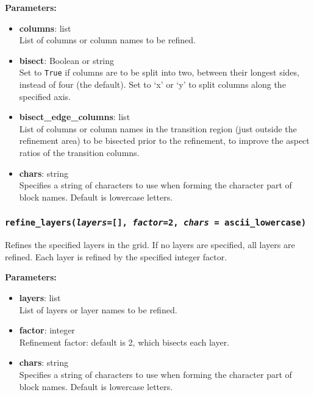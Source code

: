 \textbf{Parameters:}
\begin{itemize}
  \item \textbf{columns}: list\\
    List of columns or column names to be refined.
  \item \textbf{bisect}: Boolean or string\\
    Set to \texttt{True} if columns are to be split into two, between their longest sides, instead of four (the default).  Set to `x' or `y' to split columns along the specified axis.
  \item \textbf{bisect\_edge\_columns}: list\\
    List of columns or column names in the transition region (just outside the refinement area) to be bisected prior to the refinement, to improve the aspect ratios of the transition columns.
  \item \textbf{chars}: string\\
    Specifies a string of characters to use when forming the character part of block names.  Default is lowercase letters.
\end{itemize}

\begin{snugshade}
\subsubsection{\texttt{refine\_layers(\emph{layers}=[], \emph{factor}=2, \emph{chars} = ascii\_lowercase)}}\end{snugshade}
\label{sec:mulgrid:refine_layers}

Refines the specified layers in the grid.  If no layers are specified, all layers are refined.  Each layer is refined by the specified integer factor.

\textbf{Parameters:}
\begin{itemize}
  \item \textbf{layers}: list\\
    List of layers or layer names to be refined.
  \item \textbf{factor}: integer\\
    Refinement factor: default is 2, which bisects each layer.
  \item \textbf{chars}: string\\
    Specifies a string of characters to use when forming the character part of block names.  Default is lowercase letters.
\end{itemize}


